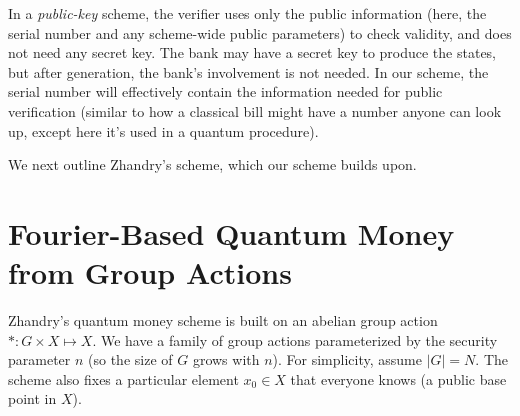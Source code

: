 \documentclass[12pt]{report}
\begin{document}
In a \emph{public-key} scheme, the verifier uses only the public information (here, the serial number and any scheme-wide public parameters) to check validity, and does not need any secret key. The bank may have a secret key to produce the states, but after generation, the bank’s involvement is not needed. In our scheme, the serial number will effectively contain the information needed for public verification (similar to how a classical bill might have a number anyone can look up, except here it’s used in a quantum procedure).

We next outline Zhandry’s scheme, which our scheme builds upon.

\section{Fourier-Based Quantum Money from Group Actions}
Zhandry’s quantum money scheme \cite{Zhandry2024} is built on an abelian group action $*:G \times X \mapsto X$. We have a family of group actions parameterized by the security parameter $n$ (so the size of $G$ grows with $n$). For simplicity, assume $|G| = N$. The scheme also fixes a particular element $x_0 \in X$ that everyone knows (a public base point in $X$).
\end{document}
